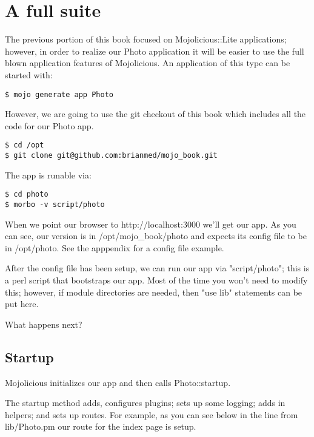 \documentclass[17pt]{extreport}
\newcommand\Small{\fontsize{10}{10.2}\selectfont}
\newcommand*\LSTfont{\Small\ttfamily\SetTracking{encoding=*}{-60}\lsstyle}
\begin{document}
\section{A full suite}

The previous portion of this book focused on Mojolicious::Lite applications;
however, in order to realize our Photo application it will be easier to use the
full blown application features of Mojolicious.  An application of this type
can be started with:

\begin{lstlisting}[style=BashInputStyle]
$ mojo generate app Photo
\end{lstlisting}

However, we are going to use the git checkout of this book which includes all the 
code for our Photo app.

\begin{lstlisting}[style=BashOutputStyle]
$ cd /opt
$ git clone git@github.com:brianmed/mojo_book.git
\end{lstlisting}

The app is runable via:

\begin{lstlisting}[style=BashInputStyle]
$ cd photo
$ morbo -v script/photo
\end{lstlisting}

When we point our browser to http://localhost:3000 we'll get our app.  As you
can see, our version is in /opt/mojo\_book/photo and expects its config file to
be in /opt/photo.  See the apppendix for a config file example.

After the config file has been setup, we can run our app via "script/photo";
this is a perl script that bootstraps our app.  Most of the time you won't need
to modify this; however, if module directories are needed, then "use lib" statements
can be put here.

What happens next?

\subsection{Startup}

Mojolicious initializes our app and then calls Photo::startup.

The startup method adds, configures plugins; sets up some logging; adds in
helpers; and sets up routes.  For example, as you can see below in the line from
lib/Photo.pm our route for the index page is setup.


\end{document}
